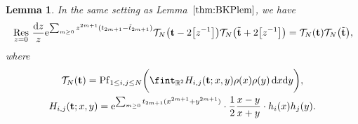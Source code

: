 \documentclass[10pt,a4paper]{amsart}
\numberwithin{equation}{section}
\newcommand{\dd}{\mathrm{d}}
\newcommand{\Res}{\mathop{\,\rm Res\,}}
\newtheorem{Lemma}[Theorem]{Lemma}
\begin{document}
\begin{Lemma}
\label{lemfinal} In the same setting as Lemma~$\ref{thm:BKPlem}$, we have
\begin{equation*}
\begin{split}
\Res_{z = 0} \frac{\dd z}{z} {\rm e}^{\sum_{m \geq 0} z^{2m + 1} (t_{2m + 1} - \tilde{t}_{2m + 1})} \mathcal{T}_N\bigl(\mathbf{t} - 2\bigl[z^{-1}\bigr]\bigr) \mathcal{T}_N\bigl(\tilde{\mathbf{t}} + 2\bigl[z^{-1}\bigr]\bigr) = \mathcal{T}_N(\mathbf{t})\mathcal{T}_N\bigl(\tilde{\mathbf{t}}\bigr),
\end{split}
\end{equation*}
where
\begin{gather}
\mathcal{T}_N(\mathbf{t}) = \operatorname{Pf}_{1 \leq i,j \leq N} \biggl( \fint_{\mathbb{R}^2} H_{i,j}(\mathbf{t};x,y) \rho(x)\rho(y)\, \dd x \dd y \biggr), \nonumber\\
H_{i,j}(\mathbf{t};x,y) = {\rm e}^{\sum_{m \geq 0} t_{2m + 1}(x^{2m + 1} + y^{2m + 1})} \cdot \frac{1}{2} \frac{x - y}{x + y}\cdot h_i(x)h_j(y) . \label{Hijt}
\end{gather}
\end{Lemma}
\end{document}
